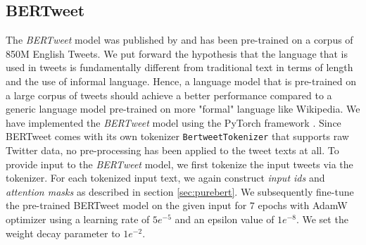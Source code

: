 \documentclass[11pt,a4paper]{article}
\begin{document}
\subsection{BERTweet}
The \textit{BERTweet} model was published by \citet{RN683} and has been pre-trained on a corpus of 850M English Tweets. We put forward the hypothesis that the language that is used in tweets is fundamentally different from traditional text in terms of length and the use of informal language. Hence, a language model that is pre-trained on a large corpus of tweets should achieve a better performance compared to a generic language model pre-trained on more "formal" language like Wikipedia.
\newline
We have implemented the \textit{BERTweet} model using the PyTorch framework \citep{RN684}. Since BERTweet comes with its own tokenizer \verb|BertweetTokenizer| that supports raw Twitter data, no pre-processing has been applied to the tweet texts at all.
\newline
To provide input to the \textit{BERTweet} model, we first tokenize the input tweets via the tokenizer. For each tokenized input text, we again construct \textit{input ids} and \textit{attention masks} as described in section \ref{sec:purebert}.
\newline
We subsequently fine-tune the pre-trained BERTweet model on the given input for $7$ epochs with AdamW optimizer \citep{RN687} using a learning rate of $5e^{-5}$ and an epsilon value of $1e^{-8}$. We set the weight decay parameter to $1e^{-2}$.
\end{document}
